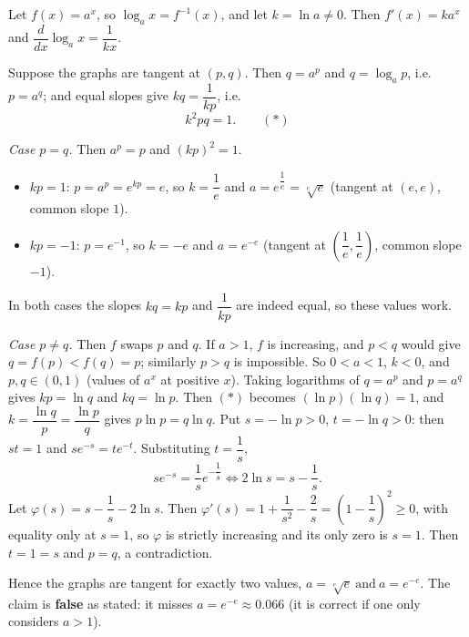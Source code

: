 Let $f(x)=a^x$, so $\log_ax=f^{-1}(x)$, and let $k=\ln a\ne0$. Then $f'(x)=ka^x$ and $\dfrac{d}{dx}\log_ax=\dfrac{1}{kx}$.

Suppose the graphs are tangent at $(p,q)$. Then $q=a^p$ and $q=\log_ap$, i.e. $p=a^q$; and equal slopes give $kq=\dfrac{1}{kp}$, i.e.
\[k^2pq=1.\qquad(\ast)\]

\emph{Case $p=q$.} Then $a^p=p$ and $(kp)^2=1$.
\begin{itemize}
\item $kp=1$: $p=a^p=e^{kp}=e$, so $k=\dfrac1e$ and $a=e^{\dfrac1e}=\sqrt[e]{e}$ (tangent at $(e,e)$, common slope $1$).
\item $kp=-1$: $p=e^{-1}$, so $k=-e$ and $a=e^{-e}$ (tangent at $\left(\dfrac1e,\dfrac1e\right)$, common slope $-1$).
\end{itemize}
In both cases the slopes $kq=kp$ and $\dfrac{1}{kp}$ are indeed equal, so these values work.

\emph{Case $p\ne q$.} Then $f$ swaps $p$ and $q$. If $a>1$, $f$ is increasing, and $p<q$ would give $q=f(p)<f(q)=p$; similarly $p>q$ is impossible. So $0<a<1$, $k<0$, and $p,q\in(0,1)$ (values of $a^x$ at positive $x$). Taking logarithms of $q=a^p$ and $p=a^q$ gives $kp=\ln q$ and $kq=\ln p$. Then $(\ast)$ becomes $(\ln p)(\ln q)=1$, and $k=\dfrac{\ln q}{p}=\dfrac{\ln p}{q}$ gives $p\ln p=q\ln q$. Put $s=-\ln p>0$, $t=-\ln q>0$: then $st=1$ and $se^{-s}=te^{-t}$. Substituting $t=\dfrac1s$,
\[se^{-s}=\dfrac1se^{-\dfrac1s}\iff2\ln s=s-\dfrac1s.\]
Let $\varphi(s)=s-\dfrac1s-2\ln s$. Then $\varphi'(s)=1+\dfrac1{s^2}-\dfrac2s=\left(1-\dfrac1s\right)^2\ge0$, with equality only at $s=1$, so $\varphi$ is strictly increasing and its only zero is $s=1$. Then $t=1=s$ and $p=q$, a contradiction.

Hence the graphs are tangent for exactly two values, $\boxed{a=\sqrt[e]{e}\ \text{and}\ a=e^{-e}}$. The claim is \textbf{false} as stated: it misses $a=e^{-e}\approx0.066$ (it is correct if one only considers $a>1$).
